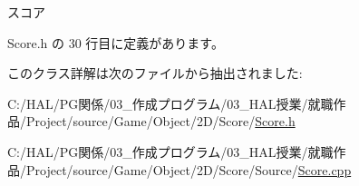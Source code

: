 スコア 



 Score.\+h の 30 行目に定義があります。



このクラス詳解は次のファイルから抽出されました\+:\begin{DoxyCompactItemize}
\item 
C\+:/\+H\+A\+L/\+P\+G関係/03\+\_\+作成プログラム/03\+\_\+\+H\+A\+L授業/就職作品/\+Project/source/\+Game/\+Object/2\+D/\+Score/\mbox{\hyperlink{_score_8h}{Score.\+h}}\item 
C\+:/\+H\+A\+L/\+P\+G関係/03\+\_\+作成プログラム/03\+\_\+\+H\+A\+L授業/就職作品/\+Project/source/\+Game/\+Object/2\+D/\+Score/\+Source/\mbox{\hyperlink{_score_8cpp}{Score.\+cpp}}\end{DoxyCompactItemize}
